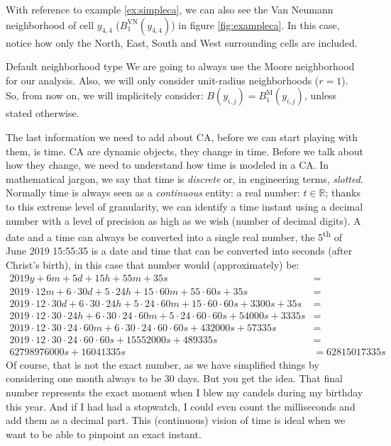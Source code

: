 \begin{example}
\label{ex:vnneigh}
With reference to example \ref{ex:simpleca}, we can also see the Van Neumann neighborhood of
cell $y_{4,4}$
($B^\text{VN}_1\left( y_{4,4} \right)$) in figure \ref{fig:exampleca}.
In this case, notice how only the North, East, South and West surrounding cells
are included.
\end{example}

\begin{important}{Default neighborhood type}
We are going to always use the Moore neighborhood for our analysis. Also, we will only consider
unit-radius neighborhoods ($r=1$). So, from now on, we will implicitely consider:
$B\left( y_{i,j} \right) = B^\text{M}_1\left( y_{i,j} \right)$, unless stated otherwise.
\end{important}

The last information we need to add about CA, before we can start playing with them, is time.
CA are dynamic objects, they change in time. Before we talk about how they change, we need to
understand how time is modeled in a CA. In mathematical jargon, we say that time is 
\textit{discrete} or, in engineering terms, \textit{slotted}. Normally time is always seen as a
\textit{continuous} entity: a real number: $t \in \mathbb{R}$; thanks to this extreme level of
granularity, we can identify a time instant using a decimal number with a level of precision as high
as we wish (number of decimal digits).
A date and a time can always be converted into a single real number,
the 5\textsuperscript{th} of June 2019 15:55:35 is a date and time that can be converted into seconds
(after Christ's birth), in this case that number would (approximately) be:
\begin{align*}
2019 y + 6 m + 5 d + 15 h + 55 m + 35 s &=\\
2019 \cdot 12 m + 6 \cdot 30 d + 5 \cdot 24 h + 15 \cdot 60 m + 55 \cdot 60 s + 35 s &=\\
2019 \cdot 12 \cdot 30 d + 6 \cdot 30 \cdot 24 h + 5 \cdot 24 \cdot 60 m +
    15 \cdot 60 \cdot 60 s + 3300 s + 35 s &=\\
2019 \cdot 12 \cdot 30 \cdot 24 h + 6 \cdot 30 \cdot 24 \cdot 60 m
    + 5 \cdot 24 \cdot 60 \cdot 60 s +
    54000 s + 3335 s &=\\
2019 \cdot 12 \cdot 30 \cdot 24 \cdot 60 m + 6 \cdot 30 \cdot 24 \cdot 60 \cdot 60 s
    + 432000 s + 57335 s &=\\
2019 \cdot 12 \cdot 30 \cdot 24 \cdot 60 \cdot 60 s + 15552000 s + 489335 s &=\\
62798976000 s + 16041335 s &= 62815017335 s
\end{align*}
Of course, that is not the exact number, as we have simplified things by considering one month always
to be 30 days. But you get the idea. That final number represents
the exact moment when I blew my candels during my birthday this year. And if I had had a stopwatch, I could
even count the milliseconds and add them as a decimal part. This (continuous) vision of time is ideal
when we want to be able to pinpoint an exact instant.

